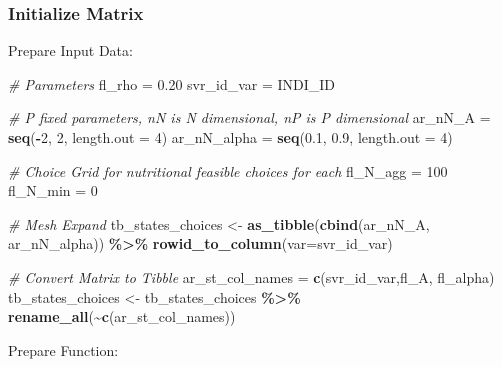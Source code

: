 \documentclass[
]{book}
\newenvironment{Shaded}{\begin{snugshade}}{\end{snugshade}}
\newcommand{\CommentTok}[1]{\textcolor[rgb]{0.56,0.35,0.01}{\textit{#1}}}
\newcommand{\DataTypeTok}[1]{\textcolor[rgb]{0.13,0.29,0.53}{#1}}
\newcommand{\DecValTok}[1]{\textcolor[rgb]{0.00,0.00,0.81}{#1}}
\newcommand{\FloatTok}[1]{\textcolor[rgb]{0.00,0.00,0.81}{#1}}
\newcommand{\KeywordTok}[1]{\textcolor[rgb]{0.13,0.29,0.53}{\textbf{#1}}}
\newcommand{\NormalTok}[1]{#1}
\newcommand{\OperatorTok}[1]{\textcolor[rgb]{0.81,0.36,0.00}{\textbf{#1}}}
\newcommand{\StringTok}[1]{\textcolor[rgb]{0.31,0.60,0.02}{#1}}
\begin{document}
\hypertarget{initialize-matrix}{%
\subsubsection{Initialize Matrix}\label{initialize-matrix}}

Prepare Input Data:

\begin{Shaded}
\begin{Highlighting}[]
\CommentTok{\# Parameters}
\NormalTok{fl\_rho =}\StringTok{ }\FloatTok{0.20}
\NormalTok{svr\_id\_var =}\StringTok{ \textquotesingle{}INDI\_ID\textquotesingle{}}

\CommentTok{\# P fixed parameters, nN is N dimensional, nP is P dimensional}
\NormalTok{ar\_nN\_A =}\StringTok{ }\KeywordTok{seq}\NormalTok{(}\OperatorTok{{-}}\DecValTok{2}\NormalTok{, }\DecValTok{2}\NormalTok{, }\DataTypeTok{length.out =} \DecValTok{4}\NormalTok{)}
\NormalTok{ar\_nN\_alpha =}\StringTok{ }\KeywordTok{seq}\NormalTok{(}\FloatTok{0.1}\NormalTok{, }\FloatTok{0.9}\NormalTok{, }\DataTypeTok{length.out =} \DecValTok{4}\NormalTok{)}

\CommentTok{\# Choice Grid for nutritional feasible choices for each}
\NormalTok{fl\_N\_agg =}\StringTok{ }\DecValTok{100}
\NormalTok{fl\_N\_min =}\StringTok{ }\DecValTok{0}

\CommentTok{\# Mesh Expand}
\NormalTok{tb\_states\_choices \textless{}{-}}\StringTok{ }\KeywordTok{as\_tibble}\NormalTok{(}\KeywordTok{cbind}\NormalTok{(ar\_nN\_A, ar\_nN\_alpha)) }\OperatorTok{\%\textgreater{}\%}\StringTok{ }
\StringTok{  }\KeywordTok{rowid\_to\_column}\NormalTok{(}\DataTypeTok{var=}\NormalTok{svr\_id\_var)}

\CommentTok{\# Convert Matrix to Tibble}
\NormalTok{ar\_st\_col\_names =}\StringTok{ }\KeywordTok{c}\NormalTok{(svr\_id\_var,}\StringTok{\textquotesingle{}fl\_A\textquotesingle{}}\NormalTok{, }\StringTok{\textquotesingle{}fl\_alpha\textquotesingle{}}\NormalTok{)}
\NormalTok{tb\_states\_choices \textless{}{-}}\StringTok{ }\NormalTok{tb\_states\_choices }\OperatorTok{\%\textgreater{}\%}\StringTok{ }\KeywordTok{rename\_all}\NormalTok{(}\OperatorTok{\textasciitilde{}}\KeywordTok{c}\NormalTok{(ar\_st\_col\_names))}
\end{Highlighting}
\end{Shaded}

Prepare Function:
\end{document}
